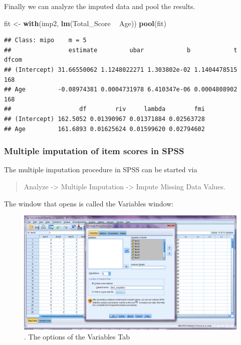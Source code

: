 \documentclass[]{book}
\newenvironment{Shaded}{\begin{snugshade}}{\end{snugshade}}
\newcommand{\KeywordTok}[1]{\textcolor[rgb]{0.13,0.29,0.53}{\textbf{#1}}}
\newcommand{\StringTok}[1]{\textcolor[rgb]{0.31,0.60,0.02}{#1}}
\newcommand{\OperatorTok}[1]{\textcolor[rgb]{0.81,0.36,0.00}{\textbf{#1}}}
\newcommand{\NormalTok}[1]{#1}
\begin{document}
Finally we can analyze the imputed data and pool the results.

\begin{Shaded}
\begin{Highlighting}[]
\NormalTok{fit <-}\StringTok{ }\KeywordTok{with}\NormalTok{(imp2, }\KeywordTok{lm}\NormalTok{(Total_Score }\OperatorTok{~}\StringTok{ }\NormalTok{Age))}
\KeywordTok{pool}\NormalTok{(fit)}
\end{Highlighting}
\end{Shaded}

\begin{verbatim}
## Class: mipo    m = 5 
##                estimate         ubar            b            t dfcom
## (Intercept) 31.66550062 1.1248022271 1.303802e-02 1.1404478515   168
## Age         -0.08974381 0.0004731978 6.410347e-06 0.0004808902   168
##                   df        riv     lambda        fmi
## (Intercept) 162.5052 0.01390967 0.01371884 0.02563728
## Age         161.6893 0.01625624 0.01599620 0.02794602
\end{verbatim}

\subsubsection{Multiple imputation of item scores in
SPSS}\label{multiple-imputation-of-item-scores-in-spss}

The multiple imputation procedure in SPSS can be started via

\begin{quote}
Analyze -\textgreater{} Multiple Imputation -\textgreater{} Impute
Missing Data Values.
\end{quote}

The window that opens is called the Variables window:

\begin{figure}

{\centering \includegraphics[width=0.9\linewidth]{images/fig8.1} 

}

\caption{. The options of the Variables Tab}\label{fig:fig8-1}
\end{figure}
\end{document}
